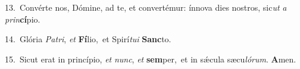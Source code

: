 {\numbfont\textcolor{\numbcolor}{13.}}~Convérte nos, Dómine, ad te, et convertémur: ínnova dies nostros, sic\textit{ut} \textit{a} \textit{prin}\-\textbf{cí}pio.\par
{\numbfont\textcolor{\numbcolor}{14.}}~Glória \textit{Pa}\-\textit{tri}, \textit{et} \textbf{Fí}\-lio,~\star et Spirí\-\textit{tu}\-\textit{i} \textbf{Sanc}\-to.\par
{\numbfont\textcolor{\numbcolor}{15.}}~Sicut erat in princípio, \textit{et} \textit{nunc}\-, \textit{et} \textbf{sem}\-per,~\star et in sǽcula sæcu\-\textit{ló}\-\textit{rum}. \textbf{A}\-men.\par
